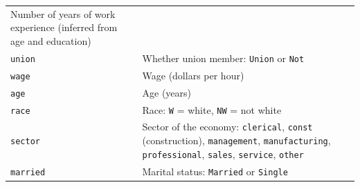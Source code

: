 \documentclass[
]{report}
\begin{document}
\begin{longtable}[]{@{}ll@{}}
\begin{minipage}[t]{0.83\columnwidth}
Number of years of work experience (inferred from age and education)\strut
\end{minipage}\tabularnewline
\begin{minipage}[t]{0.11\columnwidth}\raggedright
\texttt{union}\strut
\end{minipage} & \begin{minipage}[t]{0.83\columnwidth}\raggedright
Whether union member: \texttt{Union} or \texttt{Not}\strut
\end{minipage}\tabularnewline
\begin{minipage}[t]{0.11\columnwidth}\raggedright
\texttt{wage}\strut
\end{minipage} & \begin{minipage}[t]{0.83\columnwidth}\raggedright
Wage (dollars per hour)\strut
\end{minipage}\tabularnewline
\begin{minipage}[t]{0.11\columnwidth}\raggedright
\texttt{age}\strut
\end{minipage} & \begin{minipage}[t]{0.83\columnwidth}\raggedright
Age (years)\strut
\end{minipage}\tabularnewline
\begin{minipage}[t]{0.11\columnwidth}\raggedright
\texttt{race}\strut
\end{minipage} & \begin{minipage}[t]{0.83\columnwidth}\raggedright
Race: \texttt{W} = white, \texttt{NW} = not white \textbar{}\strut
\end{minipage}\tabularnewline
\begin{minipage}[t]{0.11\columnwidth}\raggedright
\texttt{sector}\strut
\end{minipage} & \begin{minipage}[t]{0.83\columnwidth}\raggedright
Sector of the economy: \texttt{clerical}, \texttt{const} (construction), \texttt{management}, \texttt{manufacturing}, \texttt{professional}, \texttt{sales}, \texttt{service}, \texttt{other}\strut
\end{minipage}\tabularnewline
\begin{minipage}[t]{0.11\columnwidth}\raggedright
\texttt{married}\strut
\end{minipage} & \begin{minipage}[t]{0.83\columnwidth}\raggedright
Marital status: \texttt{Married} or \texttt{Single}\strut
\end{minipage}\tabularnewline
\bottomrule
\end{longtable}
\end{document}
